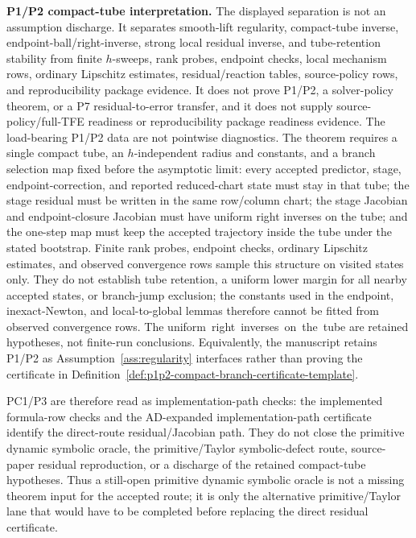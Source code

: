 \documentclass[preprint,12pt]{elsarticle}
\newcommand{\tfe}{TFE}
\begin{document}
\noindent\textbf{P1/P2 compact-tube interpretation.}
The displayed separation is
not an assumption discharge. It separates smooth-lift
regularity, compact-tube inverse, endpoint-ball/right-inverse, strong local
residual inverse, and tube-retention stability from finite \(h\)-sweeps, rank
probes, endpoint checks, local mechanism rows, ordinary Lipschitz estimates,
residual/reaction tables, source-policy rows, and reproducibility package evidence. It
does not prove P1/P2, a solver-policy theorem, or a P7 residual-to-error
transfer, and it does not supply source-policy/full-\tfe{} readiness or
reproducibility package readiness evidence.
The load-bearing P1/P2 data are not pointwise diagnostics. The theorem
requires a single compact tube, an \(h\)-independent radius and constants,
and a branch selection map fixed before the asymptotic limit: every accepted
predictor, stage, endpoint-correction, and reported reduced-chart state must
stay in that tube; the stage residual must be written in the same row/column
chart; the stage Jacobian and endpoint-closure Jacobian must have uniform
right inverses on the tube; and the one-step map must keep the accepted
trajectory inside the tube under the stated bootstrap. Finite rank probes,
endpoint checks, ordinary Lipschitz estimates, and observed convergence rows
sample this structure on visited states only. They do not establish tube
retention, a uniform lower margin for all nearby accepted states, or
branch-jump exclusion; the constants used in the endpoint, inexact-Newton,
and local-to-global lemmas therefore cannot be fitted from observed
convergence rows.
The \mbox{uniform right inverses on the tube} are retained hypotheses, not
finite-run conclusions.
Equivalently, the manuscript retains P1/P2 as Assumption~\ref{ass:regularity}
interfaces rather than proving the certificate in
Definition~\ref{def:p1p2-compact-branch-certificate-template}.

PC1/P3 are therefore read as implementation-path checks: the implemented
formula-row checks and the AD-expanded implementation-path certificate identify the
direct-route residual/Jacobian path. They do not close the primitive dynamic
symbolic oracle, the primitive/Taylor symbolic-defect route, source-paper
residual reproduction, or a discharge of the retained compact-tube
hypotheses.
Thus a still-open primitive dynamic symbolic oracle is not a missing theorem
input for the accepted route; it is only the alternative primitive/Taylor lane
that would have to be completed before replacing the direct residual
certificate.
\end{document}
